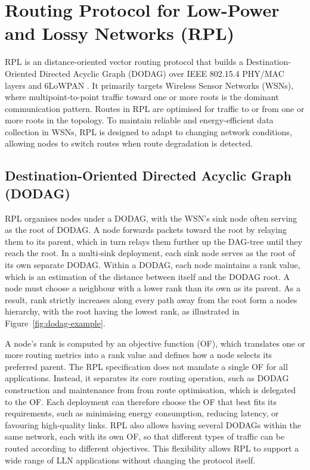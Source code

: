 \section{Routing Protocol for Low-Power and Lossy Networks (RPL)}

RPL is an distance-oriented vector routing protocol that builds a
Destination-Oriented Directed Acyclic Graph (DODAG) over IEEE
802.15.4 PHY/MAC layers and 6LoWPAN \cite{alexanderRPLIPv6Routing2012}.
It primarily targets Wireless Sensor Networks (WSNs),
where multipoint-to-point traffic toward one or more roots is the
dominant communication pattern.
Routes in RPL are optimised for traffic to or from one or more
roots in the topology. To maintain reliable and energy-efficient
data collection in WSNs, RPL is designed to adapt to changing
network conditions, allowing nodes to switch routes when route
degradation is detected.

\subsection{Destination-Oriented Directed Acyclic Graph (DODAG)}
RPL organises nodes under a DODAG, with the WSN's sink
node often serving as the root of DODAG. A node forwards packets
toward the root by relaying them to its
parent, which in turn relays them further up the DAG-tree until they
reach the root.
In a multi-sink deployment,
each sink node serves as the root of its own separate DODAG.
Within a DODAG, each node maintains a rank value, which is an estimation of the
distance between itself and the DODAG root.
A node must choose a neighbour with a lower rank than its own as
its parent. As a result, rank strictly increases along every path away
from the root form a nodes hierarchy, with the root having the lowest rank, as
illustrated in Figure~\ref{fig:dodag-example}.

A node's rank is computed by an objective function (OF), which
translates one or more routing metrics into a rank value and defines
how a node selects its preferred parent. The RPL
specification does not mandate a single OF for all applications.
Instead, it separates its core routing operation, such as DODAG
construction and maintenance from from route optimisation, which is
delegated to the OF. Each deployment can therefore choose the OF that
best fits its requirements, such as minimising energy consumption,
reducing latency, or favouring high-quality links. RPL also allows having
several DODAGs within the same network, each with its
own OF, so that different types of traffic can be routed according to
different objectives. This flexibility allows RPL to support a wide range of LLN
applications without changing the protocol itself.

